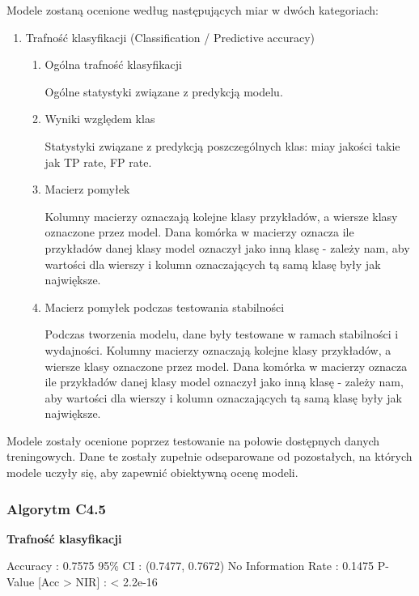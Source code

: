 \documentclass[11pt]{article} %
\begin{document}
Modele zostaną ocenione według następujących miar w dwóch kategoriach:
\begin{enumerate}
\item Trafność klasyfikacji (Classification / Predictive accuracy)
	\begin{enumerate}
	\item Ogólna trafność klasyfikacji
	
	Ogólne statystyki związane z predykcją modelu.
	
	\item Wyniki względem klas
	
	Statystyki związane z predykcją poszczególnych klas: miay jakości takie jak TP rate, FP rate.
	
	\item Macierz pomyłek
	
	Kolumny macierzy oznaczają kolejne klasy przykładów, a wiersze klasy oznaczone przez model. Dana komórka w macierzy oznacza ile przykładów danej klasy model oznaczył jako inną klasę - zależy nam, aby wartości dla wierszy i kolumn oznaczających tą samą klasę były jak największe.
	
	\item Macierz pomyłek podczas testowania stabilności
	
	Podczas tworzenia modelu, dane były testowane w ramach stabilności i wydajności. Kolumny macierzy oznaczają kolejne klasy przykładów, a wiersze klasy oznaczone przez model. Dana komórka w macierzy oznacza ile przykładów danej klasy model oznaczył jako inną klasę - zależy nam, aby wartości dla wierszy i kolumn oznaczających tą samą klasę były jak największe.
	
	\end{enumerate}
\end{enumerate}

Modele zostały ocenione poprzez testowanie na połowie dostępnych danych treningowych. Dane te zostały zupełnie odseparowane od pozostałych, na których modele uczyły się, aby zapewnić obiektywną ocenę modeli.

\subsubsection{Algorytm C4.5}

\textbf{Trafność klasyfikacji}

Accuracy : 0.7575          
                 95\% CI : (0.7477, 0.7672)
    No Information Rate : 0.1475          
    P-Value [Acc > NIR] : < 2.2e-16       
                                          
\end{document}
